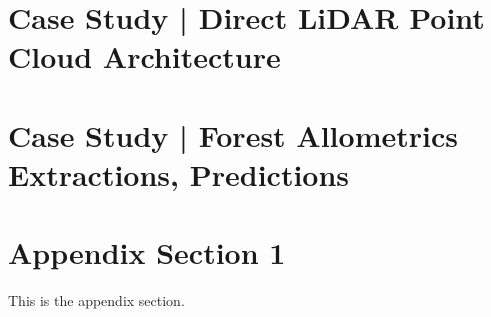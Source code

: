 \documentclass[]{article}
\theoremstyle{definition}
\numberwithin{equation}{subsection}
\begin{document}
    
\section{Case Study | Direct LiDAR Point Cloud Architecture}
    


\section{Case Study | Forest Allometrics Extractions, Predictions}




\appendix
\section{Appendix Section 1}
    This is the appendix section. 






\end{document}
